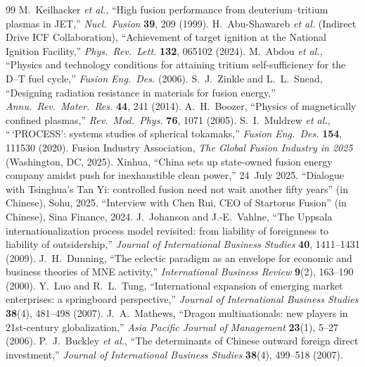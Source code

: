 \documentclass[11pt]{article}
\begin{document}
\begin{thebibliography}{99}
 M.~Keilhacker \emph{et al.}, ``High fusion performance from deuterium--tritium plasmas in JET,'' \emph{Nucl.\ Fusion} \textbf{39}, 209 (1999).
 H.~Abu-Shawareb \emph{et al.} (Indirect Drive ICF Collaboration), ``Achievement of target ignition at the National Ignition Facility,'' \emph{Phys.\ Rev.\ Lett.} \textbf{132}, 065102 (2024).
 M.~Abdou \emph{et al.}, ``Physics and technology conditions for attaining tritium self-sufficiency for the D--T fuel cycle,'' \emph{Fusion Eng.\ Des.} (2006).
 S.~J.~Zinkle and L.~L.~Snead, ``Designing radiation resistance in materials for fusion energy,'' \emph{Annu.\ Rev.\ Mater.\ Res.} \textbf{44}, 241 (2014).
 A.~H.~Boozer, ``Physics of magnetically confined plasmas,'' \emph{Rev.\ Mod.\ Phys.} \textbf{76}, 1071 (2005).
 S.~I.~Muldrew \emph{et al.}, ``\,`PROCESS': systems studies of spherical tokamaks,'' \emph{Fusion Eng.\ Des.} \textbf{154}, 111530 (2020).
 Fusion Industry Association, \emph{The Global Fusion Industry in 2025} (Washington, DC, 2025).
 Xinhua, ``China sets up state-owned fusion energy company amidst push for inexhaustible clean power,'' 24~July 2025.
 ``Dialogue with Tsinghua's Tan Yi: controlled fusion need not wait another fifty years'' (in Chinese), Sohu, 2025.
 ``Interview with Chen Rui, CEO of Startorus Fusion'' (in Chinese), Sina Finance, 2024.
 J.~Johanson and J.-E.~Vahlne, ``The Uppsala internationalization process model revisited: from liability of foreignness to liability of outsidership,'' \emph{Journal of International Business Studies} \textbf{40}, 1411--1431 (2009).
 J.~H.~Dunning, ``The eclectic paradigm as an envelope for economic and business theories of MNE activity,'' \emph{International Business Review} \textbf{9}(2), 163--190 (2000).
 Y.~Luo and R.~L.~Tung, ``International expansion of emerging market enterprises: a springboard perspective,'' \emph{Journal of International Business Studies} \textbf{38}(4), 481--498 (2007).
 J.~A.~Mathews, ``Dragon multinationals: new players in 21st-century globalization,'' \emph{Asia Pacific Journal of Management} \textbf{23}(1), 5--27 (2006).
 P.~J.~Buckley \emph{et al.}, ``The determinants of Chinese outward foreign direct investment,'' \emph{Journal of International Business Studies} \textbf{38}(4), 499--518 (2007).

\end{thebibliography}
\end{document}
